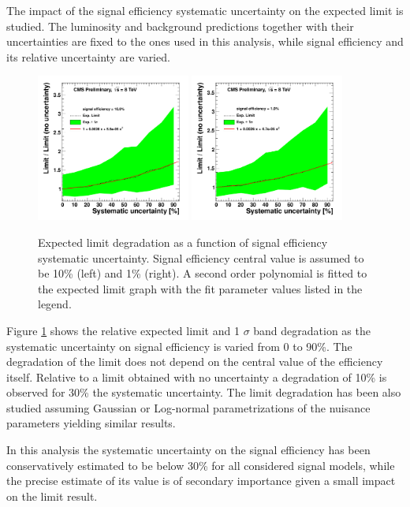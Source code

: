 
The impact of the signal efficiency systematic uncertainty on the expected limit is studied. 
The luminosity and background predictions together with their uncertainties are fixed to the ones used 
in this analysis, while signal efficiency and its relative uncertainty are varied.


\begin{figure}[htbp]
\centering
\includegraphics[width=0.45\textwidth]{plots/degradation/10percent.pdf}
\includegraphics[width=0.45\textwidth]{plots/degradation/1percent.pdf}
\caption{Expected limit degradation as a function of signal efficiency systematic uncertainty.
Signal efficiency central value is assumed to be 10\% (left) and 1\% (right). A second order polynomial
is fitted to the expected limit graph with the fit parameter values listed in the legend.\label{fig:degradation}}
\end{figure}

Figure \ref{fig:degradation} shows the relative expected limit and 1 $\sigma$ band degradation as the 
systematic uncertainty on signal efficiency is varied from 0 to 90\%. The degradation of the limit does not depend
on the central value of the efficiency itself. Relative to a limit obtained with no uncertainty a 
degradation of 10\% is observed for 30\% the systematic uncertainty. The limit degradation has been also studied 
assuming Gaussian or Log-normal parametrizations of the nuisance parameters yielding similar results.

In this analysis the systematic uncertainty on the signal efficiency has been conservatively 
estimated to be below 30\% for all considered signal models, while
the precise estimate of its value is of secondary importance given a small impact on the limit result.
      

